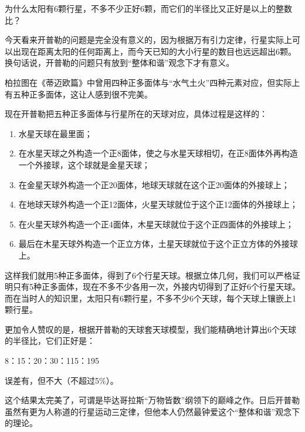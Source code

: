 为什么太阳有6颗行星，不多不少正好6颗，而它们的半径比又正好是以上的整数比？

今天看来开普勒的问题是完全没有意义的，因为根据万有引力定律，行星实际上可以出现在距离太阳的任何距离上，而今天已知的大小行星的数目也远远超出6颗。换句话说，开普勒的问题只有放到“整体和谐”观念下才有意义。

柏拉图在《蒂迈欧篇》中曾用四种正多面体与“水气土火”四种元素对应，但实际上有五种正多面体，这让人感到很不完美。

现在开普勒把五种正多面体与行星所在的天球对应，具体过程是这样的：

\begin{enumerate}
\item 

水星天球在最里面；

\item

在水星天球之外构造一个正8面体，使之与水星天球相切，在正8面体外再构造一个外接球，这个球就是金星天球；

\item

在金星天球外构造一个正20面体，地球天球就在这个正20面体的外接球上；

\item

在地球天球外构造一个正12面体，火星天球就位于这个正12面体的外接球上；

\item

在火星天球外构造一个正4面体，木星天球就位于这个正四面体的外接球上；

\item

最后在木星天球外构造一个正立方体，土星天球就位于这个正立方体的外接球上。

\end{enumerate}

这样我们就用5种正多面体，得到了6个行星天球。根据立体几何，我们可以严格证明只有5种正多面体，现在不多不少各用一次，外接内切得到了正好6个行星天球。而在当时人的知识里，太阳只有6颗行星，不多不少6个天球，每个天球上镶嵌上1颗行星。

更加令人赞叹的是，根据开普勒的天球套天球模型，我们能精确地计算出6个天球的半径比，它们正好是：

\begin{center}
8：15：20：30：115：195
\end{center}

误差有，但不大（不超过5\%）。

这个结果太完美了，可谓是毕达哥拉斯“万物皆数”纲领下的巅峰之作。日后开普勒虽然有更为人称道的行星运动三定律，但他本人仍然最钟爱这个“整体和谐”观念下的理论。

